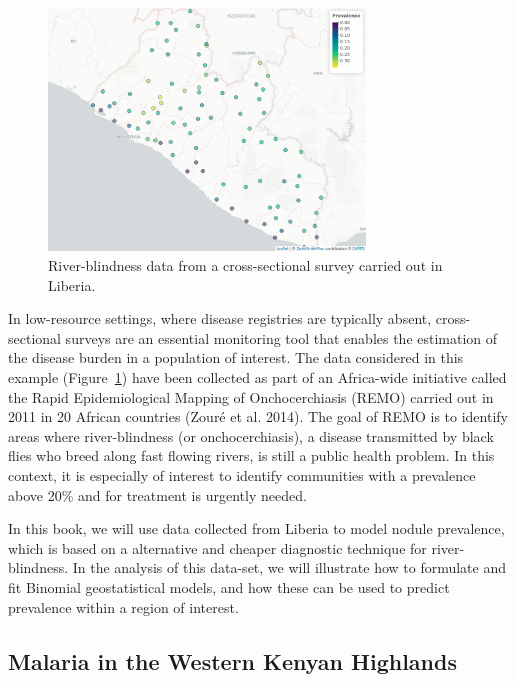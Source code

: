 \documentclass[
  letterpaper,
]{krantz}
\begin{document}
\begin{figure}

{\centering \includegraphics[width=3.31in,height=\textheight]{./figures/liberia_ch1.png}

}

\caption{\label{fig-liberia-ch1}River-blindness data from a
cross-sectional survey carried out in Liberia.}

\end{figure}

In low-resource settings, where disease registries are typically absent,
cross-sectional surveys are an essential monitoring tool that enables
the estimation of the disease burden in a population of interest. The
data considered in this example (Figure~\ref{fig-liberia-ch1}) have been
collected as part of an Africa-wide initiative called the Rapid
Epidemiological Mapping of Onchocerchiasis (REMO) carried out in 2011 in
20 African countries (Zouré et al. 2014). The goal of REMO is to
identify areas where river-blindness (or onchocerchiasis), a disease
transmitted by black flies who breed along fast flowing rivers, is still
a public health problem. In this context, it is especially of interest
to identify communities with a prevalence above 20\% and for treatment
is urgently needed.

In this book, we will use data collected from Liberia to model nodule
prevalence, which is based on a alternative and cheaper diagnostic
technique for river-blindness. In the analysis of this data-set, we will
illustrate how to formulate and fit Binomial geostatistical models, and
how these can be used to predict prevalence within a region of interest.

\hypertarget{malaria-in-the-western-kenyan-highlands}{%
\subsection{Malaria in the Western Kenyan
Highlands}\label{malaria-in-the-western-kenyan-highlands}}
\end{document}
